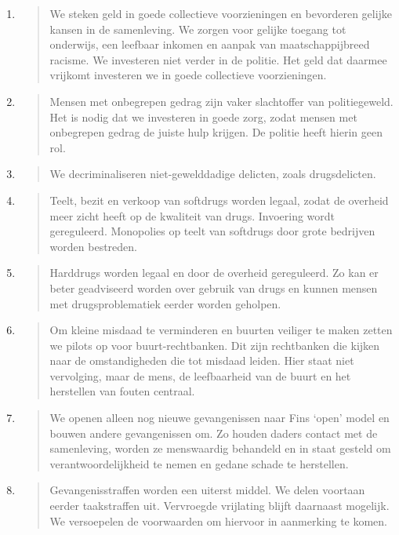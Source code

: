 \begin{enumerate}
\def\labelenumi{\arabic{enumi}.}
\item
  \begin{quote}
  We steken geld in goede collectieve voorzieningen en bevorderen
  gelijke kansen in de samenleving. We zorgen voor gelijke toegang tot
  onderwijs, een leefbaar inkomen en aanpak van maatschappijbreed
  racisme. We investeren niet verder in de politie. Het geld dat daarmee
  vrijkomt investeren we in goede collectieve voorzieningen.
  \end{quote}
\item
  \begin{quote}
  Mensen met onbegrepen gedrag zijn vaker slachtoffer van politiegeweld.
  Het is nodig dat we investeren in goede zorg, zodat mensen met
  onbegrepen gedrag de juiste hulp krijgen. De politie heeft hierin geen
  rol.
  \end{quote}
\item
  \begin{quote}
  We decriminaliseren niet-gewelddadige delicten, zoals drugsdelicten.
  \end{quote}
\item
  \begin{quote}
  Teelt, bezit en verkoop van softdrugs worden legaal, zodat de overheid
  meer zicht heeft op de kwaliteit van drugs. Invoering wordt
  gereguleerd. Monopolies op teelt van softdrugs door grote bedrijven
  worden bestreden.
  \end{quote}
\item
  \begin{quote}
  Harddrugs worden legaal en door de overheid gereguleerd. Zo kan er
  beter geadviseerd worden over gebruik van drugs en kunnen mensen met
  drugsproblematiek eerder worden geholpen.
  \end{quote}
\item
  \begin{quote}
  Om kleine misdaad te verminderen en buurten veiliger te maken zetten
  we pilots op voor buurt-rechtbanken. Dit zijn rechtbanken die kijken
  naar de omstandigheden die tot misdaad leiden. Hier staat niet
  vervolging, maar de mens, de leefbaarheid van de buurt en het
  herstellen van fouten centraal.
  \end{quote}
\item
  \begin{quote}
  We openen alleen nog nieuwe gevangenissen naar Fins `open' model en
  bouwen andere gevangenissen om. Zo houden daders contact met de
  samenleving, worden ze menswaardig behandeld en in staat gesteld om
  verantwoordelijkheid te nemen en gedane schade te herstellen.
  \end{quote}
\item
  \begin{quote}
  Gevangenisstraffen worden een uiterst middel. We delen voortaan eerder
  taakstraffen uit. Vervroegde vrijlating blijft daarnaast mogelijk. We
  versoepelen de voorwaarden om hiervoor in aanmerking te komen.
  \end{quote}
\end{enumerate}

